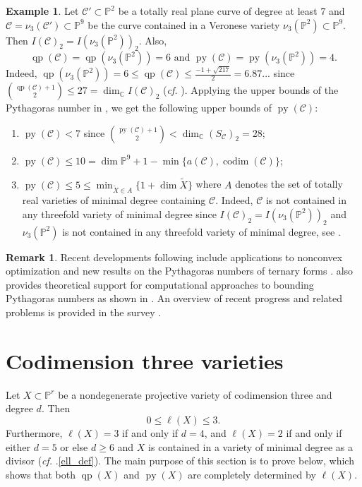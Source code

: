 \documentclass[11pt,letterpaper,reqno]{amsart}
\theoremstyle{plain}
\theoremstyle{definition}
\newtheorem{example}[theorem]{Example}
\newtheorem{remark}[theorem]{Remark}
\newtheorem{open problem}[theorem]{Open Problem}
\newtheorem{remark and notation}[theorem]{Remark and Notation}
\newtheorem{remark and definition}[theorem]{Remark and Definition}
\newtheorem{definition and notation}[theorem]{Definition and Notation}
\newtheorem{notation and convention}[theorem]{Notation and Convention}
\newtheorem{notation and remark}[theorem]{Notation and Remark}
\newtheorem{convention and notation}[theorem]{Convention and Notation}
\def \p {\mathbb{P}}
\def \c {\mathbb{C}}
\def \codim {\operatorname{codim}}
\def \py {\operatorname{py}}
\def \qp {\operatorname{qp}}
\begin{document}
\begin{example}
    Let $\mathcal{C}'\subset\p^2$ be a totally real plane curve of degree at least $7$ and $\mathcal{C} = \nu_3(\mathcal{C}')\subset\p^9$ be the curve contained in a Veronese variety $\nu_3(\p^2)\subset \p^9$. 
    Then $I(\mathcal{C})_2=I(\nu_3(\p^2))_2$.
    Also, $$\qp(\mathcal{C}) = \qp(\nu_3(\p^2)) = 6 \text{ and } \py(\mathcal{C}) = \py(\nu_3(\p^2)) = 4.$$ 
    Indeed, $\qp(\nu_3(\p^2)) = 6 \le \qp(\mathcal{C}) \le \frac{-1+\sqrt{217}}{2}=6.87...$ since $\binom{\qp(\mathcal{C})+1}{2}\le 27 = \dim_\c I(\mathcal{C})_2$ (\textit{cf.} \cite[Corollary 3.7]{MR4397034}).
    Applying the upper bounds of the Pythagoras number in \cite[Theorem 1.1]{MR4397034}, we get the following upper bounds of $\py(\mathcal{C})$:
    \begin{enumerate}[\rm (i)]
        \item $\py(\mathcal{C}) < 7$ since $\binom{\py(\mathcal{C})+1}{2} < \dim_{\c}(S_{\mathcal{C}})_2 = 28$;
        \item $\py(\mathcal{C}) \le 10=\dim\p^9+1-\min\{a(\mathcal{C}),\codim(\mathcal{C})\}$;
        \item $\py(\mathcal{C}) \le 5 \le \min_{\widetilde{X}\in A}\{1+\dim \widetilde{X}\}$ where $A$ denotes the set of totally real varieties of minimal degree containing $\mathcal{C}$.
        Indeed, $\mathcal{C}$ is not contained in any threefold variety of minimal degree since $I(\mathcal{C})_2=I(\nu_3(\p^2))_2$ and $\nu_3(\p^2)$ is not contained in any threefold variety of minimal degree, see \cite[p. 151]{MR739785}. 
    \end{enumerate}
\end{example}

\begin{remark}
Recent developments following \cite{MR4397034} include applications to nonconvex optimization \cite{blekherman2024spurious} and new results on the Pythagoras numbers of ternary forms \cite{blekherman2024pythagoras}. 
\cite{MR4397034} also provides theoretical support for computational approaches to bounding Pythagoras numbers as shown in \cite{arevalo2022minimizacion}.
An overview of recent progress and related problems is provided in the survey \cite{MR4249429}.
\end{remark}

\bigskip

\section{Codimension three varieties}\label{sec:Codim3}
Let $X \subset \mathbb{P}^r$ be a nondegenerate projective variety of codimension three and degree $d$. Then 
\begin{equation*}0 \leq \ell (X) \leq 3.
\end{equation*}
Furthermore, $\ell (X) = 3$ if and only if $d = 4$, and $\ell (X) = 2$ if and only if either $d=5$ or else $d \geq 6$ and $X$ is contained in a variety of minimal degree as a divisor (\textit{cf.} .\eqref{ell_def}).
The main purpose of this section is to prove  below, which shows that both $\qp(X)$ and $\py(X)$ are completely determined by $\ell (X)$. 
\end{document}
